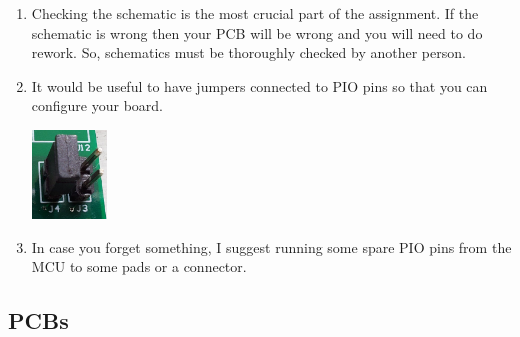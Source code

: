 \documentclass[11pt, a4paper]{article}
\begin{document}
\begin{enumerate}
\item Checking the schematic is the most crucial part of the
  assignment.  If the schematic is wrong then your PCB will be wrong
  and you will need to do rework.  So, schematics must be thoroughly
  checked by another person.

\item It would be useful to have jumpers connected to PIO pins so
  that you can configure your board.

\includegraphics[width=2cm]{../guide/figs/jumpers.jpg}

\item In case you forget something, I suggest running some spare PIO
  pins from the MCU to some pads or a connector.

\end{enumerate}


\subsection{PCBs}
\end{document}
